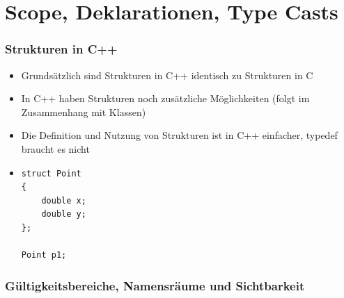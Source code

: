 

\part{Scope, Deklarationen, Type Casts}
\label{sec:Kapitel 5: Scope, Deklarationen, Type Casts}


\section{Strukturen in C++}
\label{sec:Strukturen in C++}
\begin{itemize}
	\item Grundsätzlich sind Strukturen in C++ identisch zu Strukturen in C
	\item In C++ haben Strukturen noch zusätzliche Möglichkeiten (folgt im Zusammenhang mit Klassen)
	\item Die Definition und Nutzung von Strukturen ist in C++ einfacher, typedef braucht es nicht
	\item[\-] 
	\noindent
\begin{minipage}{\linewidth}
\begin{lstlisting}
struct Point
{
	double x;
	double y;		
};
	
Point p1;
\end{lstlisting}
\end{minipage}
\end{itemize}

\section{Gültigkeitsbereiche, Namensräume und Sichtbarkeit}
\label{sec:Gueltigkeitsbereiche, Namensraeume und Sichtbarkeit}

